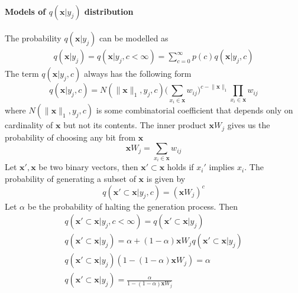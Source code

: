 \documentclass[12pt]{article}
\begin{document}
 \paragraph{Models of $q(\boldsymbol{x}|y_j)$ distribution}
 The probability $q(\boldsymbol{x}|y_j)$ can be modelled as
 \begin{gather*} 
q(\boldsymbol{x}|y_j) = q(\boldsymbol{x}|y_j,c<\infty) = \sum_{c=0}^{\infty} p(c) q(\boldsymbol{x}|y_j,c)
 \end{gather*}
The term $q(\boldsymbol{x}|y_j,c)$ always has the following form
\[
q(\boldsymbol{x}|y_j,c) = N(\lVert\boldsymbol{x} \rVert_1 ,y_j,c)\big(\sum_{x_i\in\boldsymbol{x}} w_{ij}\big)^{ c - \lVert\boldsymbol{x} \rVert_1  }\prod_{x_i\in\boldsymbol{x}} w_{ij}
\]
where $N(\lVert\boldsymbol{x} \rVert_1 ,y_j,c)$ is some combinatorial coefficient that depends only on cardinality of $\boldsymbol{x}$ but not its contents. The inner product  $\boldsymbol{x}W_j$ gives us the probability of choosing any bit from $\boldsymbol{x}$
\[
\boldsymbol{x}W_j = \sum_{x_i\in\boldsymbol{x}} w_{ij}
\]
Let $\boldsymbol{x}', \boldsymbol{x}$ be two binary vectors, then $\boldsymbol{x}' \subset \boldsymbol{x}$ holds if $x_i'$ implies $x_i$. The probability of generating a subset of $\boldsymbol{x}$ is given by
\[
q(\boldsymbol{x}' \subset \boldsymbol{x}|y_j,c) = (\boldsymbol{x}W_j)^c
\]
Let $\alpha$ be the probability of halting the generation process. Then 
\begin{gather*}
q(\boldsymbol{x}' \subset \boldsymbol{x}|y_j,c<\infty) = q(\boldsymbol{x}' \subset \boldsymbol{x}|y_j) \\
q(\boldsymbol{x}' \subset \boldsymbol{x}|y_j) = \alpha + (1-\alpha)\boldsymbol{x}W_j q(\boldsymbol{x}' \subset \boldsymbol{x}|y_j) \\
q(\boldsymbol{x}' \subset \boldsymbol{x}|y_j)(1-(1-\alpha)\boldsymbol{x}W_j ) = \alpha \\
q(\boldsymbol{x}' \subset \boldsymbol{x}|y_j) = \frac{\alpha}{1-(1-\alpha)\boldsymbol{x}W_j } \\
\end{gather*}
\end{document}
